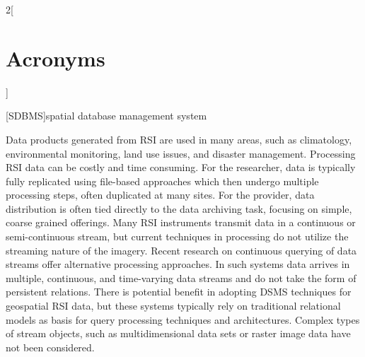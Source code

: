 \documentclass{ucdthesis}       %
\begin{document}
\begin{frontmatter}
\begin{multicols}{2}[\chapter*{Acronyms}]
{\begin{acronym}
[SDBMS]{spatial database management system}
  \end{acronym}
}
\end{multicols}


\clearpage
\begin{inlineabstract}
  Data products generated from \acf{RSI} are used in many areas, such
  as climatology, environmental monitoring, land use issues, and
  disaster management.  Processing \ac{RSI} data can be costly and
  time consuming.  For the researcher, data is typically fully
  replicated using file-based approaches which then undergo multiple
  processing steps, often duplicated at many sites.  For the provider,
  data distribution is often tied directly to the data archiving task,
  focusing on simple, coarse grained offerings.  Many \ac{RSI}
  instruments transmit data in a continuous or semi-continuous stream,
  but current techniques in processing do not utilize the streaming
  nature of the imagery.  Recent research on continuous querying of
  data streams offer alternative processing approaches.  In such
  systems data arrives in multiple, continuous, and time-varying data
  streams and do not take the form of persistent relations.  There is
  potential benefit in adopting \acf{DSMS} techniques for geospatial
  \ac{RSI} data, but these systems typically rely on traditional
  relational models as basis for query processing techniques and
  architectures.  Complex types of stream objects, such as
  multidimensional data sets or raster image data have not been
  considered.


\end{inlineabstract}
\end{frontmatter}
\end{document}
